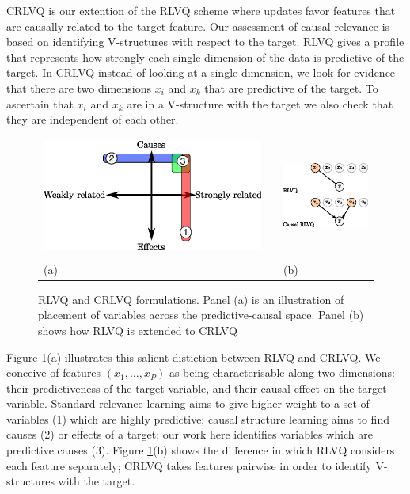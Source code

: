 \documentclass{esannV2}
\begin{document}
CRLVQ is our extention of the RLVQ scheme where updates favor features that are causally related to the target feature. Our assessment of causal relevance is based on identifying V-structures with respect to the target. RLVQ gives a profile that represents how strongly each single dimension of the data is predictive of the target. In CRLVQ instead of looking at a single dimension, we look for evidence that there are two dimensions $x_i$ and $x_k$ that are predictive of the target. To ascertain that $x_i$ and $x_k$ are in a V-structure with the target we also check that they are independent of each other.

\begin{figure}
\begin{tabular}{m{}cm{}}
\includegraphics[width=.5\textwidth]{causal-relevance-dimensions.eps} & &
\includegraphics[width=.35\textwidth]{rlvq-crlvq.eps} \\
& \\
(a) & & (b)  
\end{tabular}
\label{fig:causes}
\caption{RLVQ and CRLVQ formulations. Panel (a) is an illustration of placement of variables across the predictive-causal space. Panel (b) shows how RLVQ is extended to CRLVQ}
\end{figure}

Figure \ref{fig:causes}(a) illustrates this salient distiction between RLVQ and CRLVQ. We conceive of features $(x_1, \ldots, x_P)$ as being characterisable along two dimensions: their predictiveness of the target variable, and their causal effect on the target variable. Standard relevance learning aims to give higher weight to a set of variables (1) which are highly predictive; causal structure learning aims to find causes (2) or effects of a target; our work here identifies variables which are predictive causes (3). Figure \ref{fig:causes}(b) shows the difference in which RLVQ considers each feature separately; CRLVQ takes features pairwise in order to identify V-structures with the target.
 
\end{document}
